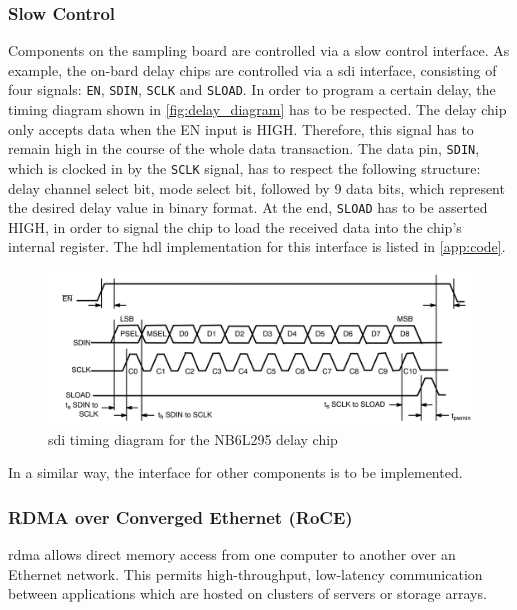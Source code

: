 \subsubsection*{Slow Control}
Components on the sampling board are controlled via a slow control interface. 
As example, the on-bard delay chips are controlled via a \gls{sdi} interface, consisting of four signals: \texttt{EN}, \texttt{SDIN}, \texttt{SCLK} and \texttt{SLOAD}. 
In order to program a certain delay, the timing diagram shown in \autoref{fig:delay_diagram} has to be respected.
The delay chip only accepts data when the EN input is HIGH. 
Therefore, this signal has to remain high in the course of the whole data transaction. 
The data pin, \texttt{SDIN}, which is clocked in by the \texttt{SCLK} signal, has to respect the following structure: delay channel select bit, mode select bit, followed by 9 data bits, which represent the desired delay value in binary format.
At the end, \texttt{SLOAD} has to be asserted HIGH, in order to signal the chip to load the received data into the chip's internal register.
The \gls{hdl} implementation for this interface is listed in \autoref{app:code}. %

\begin{figure}[tbh]
	\centering
	\includegraphics[width = \textwidth]{chap/05-readout/img/sdi_interface_delay}
	\caption{\gls{sdi} timing diagram for the NB6L295 delay chip \cite{NB6L295}}
	\label{fig:delay_diagram}
\end{figure}

In a similar way, the interface for other components is to be implemented.

\subsubsection*{RDMA over Converged Ethernet (RoCE)}
\Gls{rdma} allows direct memory access from one computer to another over an Ethernet network. This permits high-throughput, low-latency communication between applications which are hosted on clusters of servers or storage arrays. 


